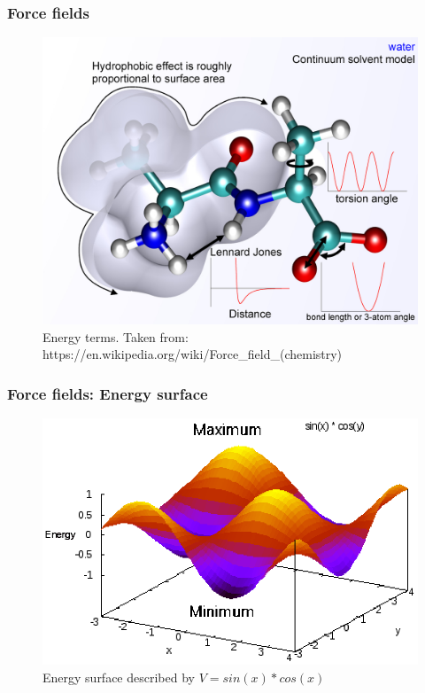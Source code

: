 \documentclass{beamer}
\begin{document}
\begin{frame}\frametitle{Force fields}

\begin{figure}
\includegraphics[scale=1.441]{1024px-MM_PEF.png}
\caption{{\scriptsize Energy terms. Taken from: https://en.wikipedia.org/wiki/Force\_field\_(chemistry)}}
\end{figure}


\end{frame}

\begin{frame}\frametitle{Force fields: Energy surface}

\begin{figure}
\includegraphics[scale=0.681]{surface.eps}
\caption{{\scriptsize Energy surface described by $V=sin(x)*cos(x)$}}
\end{figure}

\end{frame}
\end{document}
